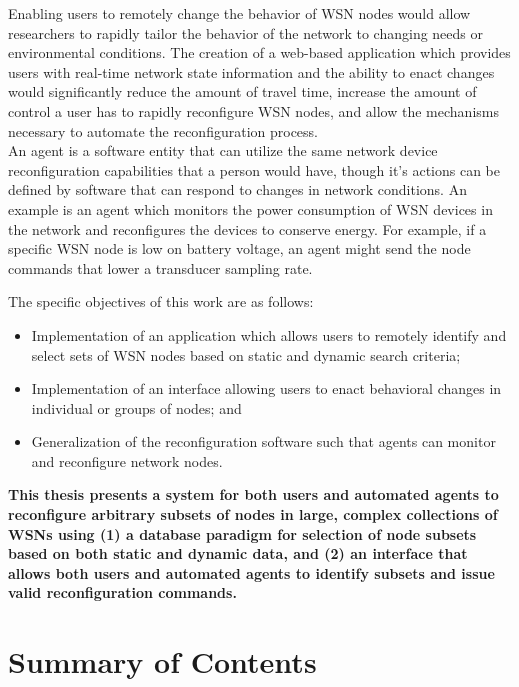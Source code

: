 Enabling users to remotely change the behavior of WSN nodes would allow researchers to rapidly tailor the behavior of the network to changing needs or environmental conditions. The creation of a web-based application which provides users with real-time network state information and the ability to enact changes would significantly reduce the amount of travel time, increase the amount of control a user has to rapidly reconfigure WSN nodes, and allow the mechanisms necessary to automate the reconfiguration process.\\ 

An agent is a software entity that can utilize the same network device reconfiguration capabilities that a person would have, though it's actions can be defined by software that can respond to changes in network conditions. An example is an agent which monitors the power consumption of WSN devices in the network and reconfigures the devices to conserve energy. For example, if a specific WSN node is low on battery voltage, an agent might send the node commands that lower a transducer sampling rate.

The specific objectives of this work are as follows:

\begin{itemize}
	\item Implementation of an application which allows users to remotely identify and select sets of WSN nodes based on static and dynamic search criteria;
	\item Implementation of an interface allowing users to enact behavioral changes in individual or groups of nodes; and
	\item Generalization of the reconfiguration software such that agents can monitor and reconfigure network nodes.
\end{itemize}


\textbf{This thesis presents a system for both users and automated agents to reconfigure arbitrary subsets of nodes in large, complex collections of WSNs using (1) a database paradigm for selection of node subsets based on both static and dynamic data, and (2) an interface that allows both users and automated agents to identify subsets and issue valid reconfiguration commands.}

\section{Summary of Contents}


